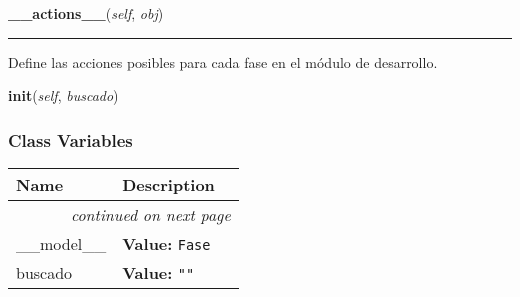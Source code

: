     \vspace{0.5ex}

\hspace{.8\funcindent}\begin{boxedminipage}{\funcwidth}

    \raggedright \textbf{\_\_actions\_\_}(\textit{self}, \textit{obj})

    \vspace{-1.5ex}

    \rule{\textwidth}{0.5\fboxrule}
\setlength{\parskip}{2ex}
    Define las acciones posibles para cada fase en el módulo de desarrollo.

\setlength{\parskip}{1ex}
    \end{boxedminipage}

    \label{saip:controllers:desarrollo_fase_controller:FaseTableFiller:init}

    \vspace{0.5ex}

\hspace{.8\funcindent}\begin{boxedminipage}{\funcwidth}

    \raggedright \textbf{init}(\textit{self}, \textit{buscado})

\setlength{\parskip}{2ex}
\setlength{\parskip}{1ex}
    \end{boxedminipage}



  \subsubsection{Class Variables}

    \vspace{-1cm}
\hspace{\varindent}\begin{longtable}{|p{\varnamewidth}|p{\vardescrwidth}|l}
\cline{1-2}
\cline{1-2} \centering \textbf{Name} & \centering \textbf{Description}& \\
\cline{1-2}
\endhead\cline{1-2}\multicolumn{3}{r}{\small\textit{continued on next page}}\\\endfoot\cline{1-2}
\endlastfoot\raggedright \_\-\_\-m\-o\-d\-e\-l\-\_\-\_\- & \raggedright \textbf{Value:} 
{\tt Fase}&\\
\cline{1-2}
\raggedright b\-u\-s\-c\-a\-d\-o\- & \raggedright \textbf{Value:} 
{\tt ""}&\\
\cline{1-2}
\end{longtable}


